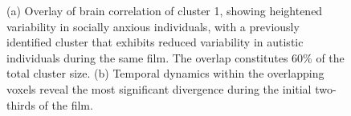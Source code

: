 \begin{figure}[!ht]
	\centering
	\caption{(a) Overlay of brain correlation of cluster 1, showing heightened variability in socially anxious individuals, with a previously identified cluster that exhibits reduced variability in autistic individuals during the same film. The overlap constitutes 60\% of the total cluster size. (b) Temporal dynamics within the overlapping voxels reveal the most significant divergence during the initial two-thirds of the film.}
    \vspace*{-10pt}
	\label{fig:isc-asc-sa}
\end{figure}

